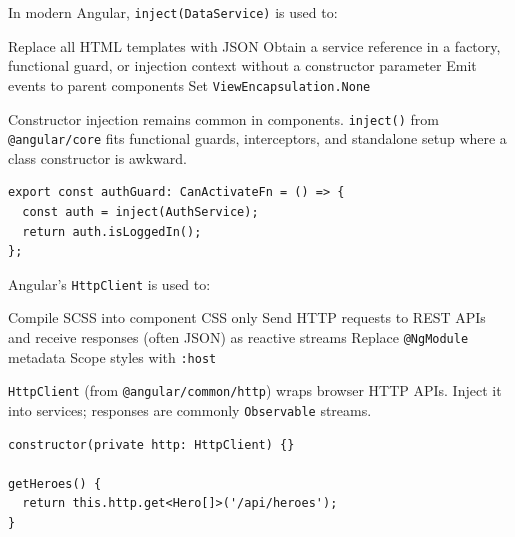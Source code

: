 \newpage



\question[4]
In modern Angular, \lstinline[style=tsinline]|inject(DataService)| is used to:
\begin{choices}
  \choice Replace all HTML templates with JSON
  \CorrectChoice Obtain a service reference in a factory, functional guard, or injection context without a constructor parameter
  \choice Emit events to parent components
  \choice Set \lstinline[style=tsinline]|ViewEncapsulation.None|
\end{choices}
\begin{solution}
  Constructor injection remains common in components. \lstinline[style=tsinline]|inject()| from \lstinline[style=tsinline]|@angular/core| fits functional guards, interceptors, and standalone setup where a class constructor is awkward.
\begin{lstlisting}[style=ts]
export const authGuard: CanActivateFn = () => {
  const auth = inject(AuthService);
  return auth.isLoggedIn();
};
\end{lstlisting}
\end{solution}

\question[4]
Angular's \lstinline[style=tsinline]|HttpClient| is used to:
\begin{choices}
  \choice Compile SCSS into component CSS only
  \CorrectChoice Send HTTP requests to REST APIs and receive responses (often JSON) as reactive streams
  \choice Replace \lstinline[style=tsinline]|@NgModule| metadata
  \choice Scope styles with \lstinline[style=htmlinline]|:host|
\end{choices}
\begin{solution}
  \lstinline[style=tsinline]|HttpClient| (from \lstinline[style=tsinline]|@angular/common/http|) wraps browser HTTP APIs. Inject it into services; responses are commonly \lstinline[style=tsinline]|Observable| streams.
\begin{lstlisting}[style=ts]
constructor(private http: HttpClient) {}

getHeroes() {
  return this.http.get<Hero[]>('/api/heroes');
}
\end{lstlisting}
\end{solution}

